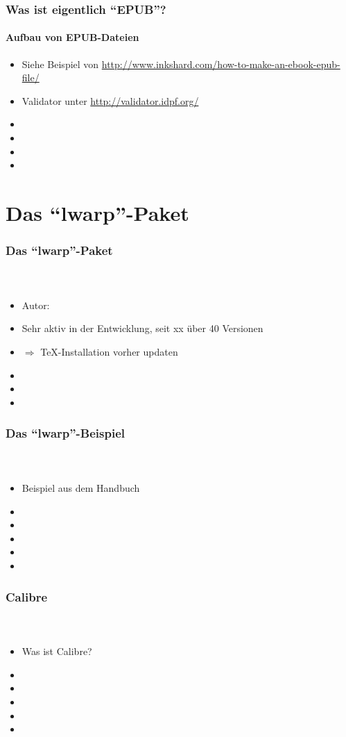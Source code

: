 \documentclass[12pt,ngerman]{beamer}
\begin{document}
\begin{frame}
\frametitle{Was ist eigentlich \enquote{EPUB}?}
\framesubtitle{Aufbau von EPUB-Dateien}

\begin{itemize}
\item Siehe Beispiel von \url{http://www.inkshard.com/how-to-make-an-ebook-epub-file/}
\item Validator unter \url{http://validator.idpf.org/}
\item 
\item 
\item 
\item 
\end{itemize}
\end{frame}

\section{Das \enquote{lwarp}-Paket}

\begin{frame}
\frametitle{Das \enquote{lwarp}-Paket}
\framesubtitle{~}

\begin{itemize}
\item Autor: 
\item Sehr aktiv in der Entwicklung, seit xx über 40 Versionen
\item $\Rightarrow$ \TeX-Installation vorher updaten
\item 
\item 
\item 
\end{itemize}
\end{frame}

\begin{frame}
\frametitle{Das \enquote{lwarp}-Beispiel}
\framesubtitle{~}

\begin{itemize}
\item Beispiel aus dem Handbuch
\item 
\item 
\item 
\item 
\item 
\end{itemize}
\end{frame}


\begin{frame}
\frametitle{Calibre}
\framesubtitle{~}

\begin{itemize}
\item Was ist Calibre?
\item 
\item 
\item 
\item 
\item 
\end{itemize}
\end{frame}
\end{document}
